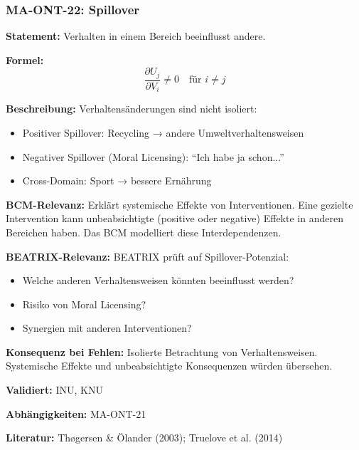 
\subsubsection*{MA-ONT-22: Spillover}

\textbf{Statement:} Verhalten in einem Bereich beeinflusst andere.

\textbf{Formel:}
\begin{equation}
\frac{\partial U_j}{\partial V_i} \neq 0 \quad \text{für } i \neq j
\end{equation}

\textbf{Beschreibung:}
Verhaltensänderungen sind nicht isoliert:
\begin{itemize}
    \item Positiver Spillover: Recycling → andere Umweltverhaltensweisen
    \item Negativer Spillover (Moral Licensing): ``Ich habe ja schon...''
    \item Cross-Domain: Sport → bessere Ernährung
\end{itemize}

\textbf{BCM-Relevanz:}
Erklärt systemische Effekte von Interventionen. Eine gezielte Intervention kann unbeabsichtigte (positive oder negative) Effekte in anderen Bereichen haben. Das BCM modelliert diese Interdependenzen.

\textbf{BEATRIX-Relevanz:}
BEATRIX prüft auf Spillover-Potenzial:
\begin{itemize}
    \item Welche anderen Verhaltensweisen könnten beeinflusst werden?
    \item Risiko von Moral Licensing?
    \item Synergien mit anderen Interventionen?
\end{itemize}

\textbf{Konsequenz bei Fehlen:}
Isolierte Betrachtung von Verhaltensweisen. Systemische Effekte und unbeabsichtigte Konsequenzen würden übersehen.

\textbf{Validiert:} INU, KNU

\textbf{Abhängigkeiten:} MA-ONT-21

\textbf{Literatur:} Thøgersen \& Ölander (2003); Truelove et al. (2014)


